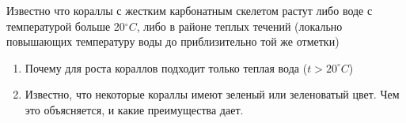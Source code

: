 
Известно что кораллы с жестким карбонатным скелетом растут либо воде с температурой больше 20$^{\circ}C$, либо в 
    районе теплых течений (локально повышающих температуру воды до приблизительно той же отметки)

\begin{enumerate}
    \item Почему для роста кораллов подходит только теплая вода ($t> 20^{\circ}C$)
    \item Известно, что некоторые кораллы имеют зеленый или зеленоватый цвет. Чем это объясняется, и какие преимущества дает.
\end{enumerate}
